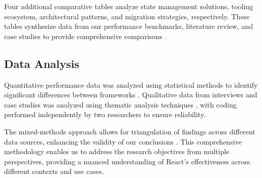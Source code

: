 Four additional comparative tables analyze state management solutions, tooling ecosystem, architectural patterns, and migration strategies, respectively. These tables synthesize data from our performance benchmarks, literature review, and case studies to provide comprehensive comparisons \cite{zhang2021}.

\subsection{Data Analysis}
Quantitative performance data was analyzed using statistical methods to identify significant differences between frameworks \cite{pereira2020}. Qualitative data from interviews and case studies was analyzed using thematic analysis techniques \cite{braun2006}, with coding performed independently by two researchers to ensure reliability.

The mixed-methods approach allows for triangulation of findings across different data sources, enhancing the validity of our conclusions \cite{creswell2017}. This comprehensive methodology enables us to address the research objectives from multiple perspectives, providing a nuanced understanding of React's effectiveness across different contexts and use cases.
